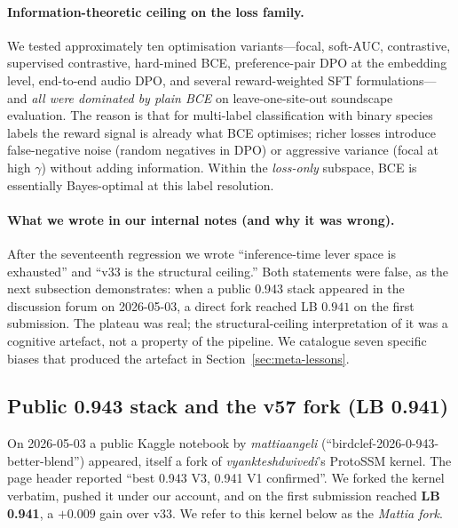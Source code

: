 \paragraph{Information-theoretic ceiling on the loss family.}
We tested approximately ten optimisation variants---focal,
soft-AUC, contrastive, supervised contrastive, hard-mined BCE,
preference-pair DPO at the embedding level, end-to-end audio
DPO, and several reward-weighted SFT formulations---and \emph{all
were dominated by plain BCE} on leave-one-site-out
soundscape evaluation. The reason is that for multi-label
classification with binary species labels the reward signal is
already what BCE optimises; richer losses introduce false-negative
noise (random negatives in DPO) or aggressive variance (focal at
high $\gamma$) without adding information. Within the
\emph{loss-only} subspace, BCE is essentially Bayes-optimal at
this label resolution.

\paragraph{What we wrote in our internal notes (and why it was wrong).}
After the seventeenth regression we wrote ``inference-time lever
space is exhausted'' and ``v33 is the structural ceiling.''
Both statements were false, as the next subsection demonstrates:
when a public 0.943 stack appeared in the discussion forum on
2026-05-03, a direct fork reached LB $0.941$ on the first
submission. The plateau was real; the structural-ceiling
interpretation of it was a cognitive artefact, not a property
of the pipeline. We catalogue seven specific biases that
produced the artefact in
Section~\ref{sec:meta-lessons}.


\subsection{Public 0.943 stack and the v57 fork (LB 0.941)}
\label{sec:mattia-fork}

On 2026-05-03 a public Kaggle notebook by \emph{mattiaangeli}
(``birdclef-2026-0-943-better-blend'') appeared, itself a fork of
\emph{vyankteshdwivedi}'s ProtoSSM kernel. The page header reported
``best 0.943 V3, 0.941 V1 confirmed''. We forked the kernel
verbatim, pushed it under our account, and on the first submission
reached \textbf{LB 0.941}, a $+0.009$ gain over v33. We refer to
this kernel below as the \emph{Mattia fork}.

